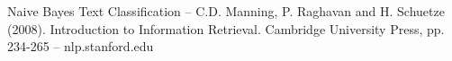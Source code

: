 \begin{thebibliography}{10}
	\bibitem{} Naive Bayes Text Classification  – C.D. Manning, P. Raghavan and H. Schuetze (2008). Introduction to Information Retrieval. Cambridge University Press, pp. 234-265 – nlp.stanford.edu
    
\end{thebibliography}